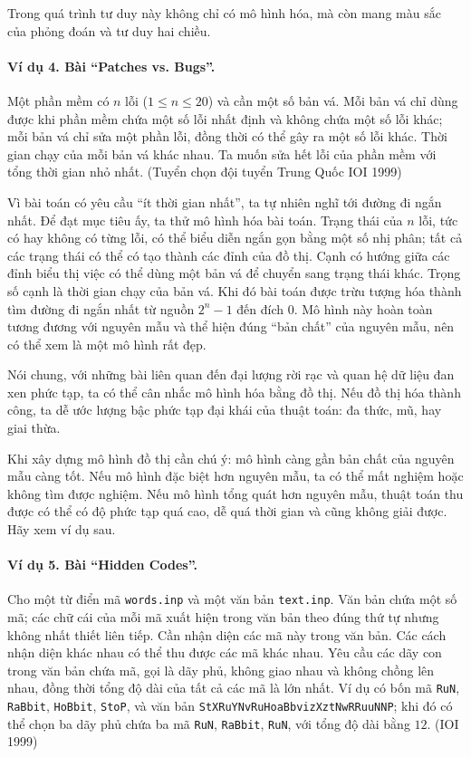 \documentclass[11pt]{article}
\begin{document}
Trong quá trình tư duy này không chỉ có mô hình hóa, mà còn mang màu sắc của
phỏng đoán và tư duy hai chiều.

\paragraph{Ví dụ 4. Bài ``Patches vs. Bugs''.}
Một phần mềm có \(n\) lỗi (\(1\le n\le 20\)) và cần một số bản vá. Mỗi bản vá
chỉ dùng được khi phần mềm chứa một số lỗi nhất định và không chứa một số lỗi
khác; mỗi bản vá chỉ sửa một phần lỗi, đồng thời có thể gây ra một số lỗi
khác. Thời gian chạy của mỗi bản vá khác nhau. Ta muốn sửa hết lỗi của phần
mềm với tổng thời gian nhỏ nhất. (Tuyển chọn đội tuyển Trung Quốc IOI 1999)

Vì bài toán có yêu cầu ``ít thời gian nhất'', ta tự nhiên nghĩ tới đường đi
ngắn nhất. Để đạt mục tiêu ấy, ta thử mô hình hóa bài toán. Trạng thái của
\(n\) lỗi, tức có hay không có từng lỗi, có thể biểu diễn ngắn gọn bằng một số
nhị phân; tất cả các trạng thái có thể có tạo thành các đỉnh của đồ thị. Cạnh
có hướng giữa các đỉnh biểu thị việc có thể dùng một bản vá để chuyển sang
trạng thái khác. Trọng số cạnh là thời gian chạy của bản vá. Khi đó bài toán
được trừu tượng hóa thành tìm đường đi ngắn nhất từ nguồn \(2^n-1\) đến đích
\(0\). Mô hình này hoàn toàn tương đương với nguyên mẫu và thể hiện đúng
``bản chất'' của nguyên mẫu, nên có thể xem là một mô hình rất đẹp.

Nói chung, với những bài liên quan đến đại lượng rời rạc và quan hệ dữ liệu
đan xen phức tạp, ta có thể cân nhắc mô hình hóa bằng đồ thị. Nếu đồ thị hóa
thành công, ta dễ ước lượng bậc phức tạp đại khái của thuật toán: đa thức,
mũ, hay giai thừa.

Khi xây dựng mô hình đồ thị cần chú ý: mô hình càng gần bản chất của nguyên
mẫu càng tốt. Nếu mô hình đặc biệt hơn nguyên mẫu, ta có thể mất nghiệm hoặc
không tìm được nghiệm. Nếu mô hình tổng quát hơn nguyên mẫu, thuật toán thu
được có thể có độ phức tạp quá cao, dễ quá thời gian và cũng không giải được.
Hãy xem ví dụ sau.

\paragraph{Ví dụ 5. Bài ``Hidden Codes''.}
Cho một từ điển mã \texttt{words.inp} và một văn bản \texttt{text.inp}. Văn bản
chứa một số mã; các chữ cái của mỗi mã xuất hiện trong văn bản theo đúng thứ
tự nhưng không nhất thiết liên tiếp. Cần nhận diện các mã này trong văn bản.
Các cách nhận diện khác nhau có thể thu được các mã khác nhau. Yêu cầu các
dãy con trong văn bản chứa mã, gọi là dãy phủ, không giao nhau và không chồng
lên nhau, đồng thời tổng độ dài của tất cả các mã là lớn nhất. Ví dụ có bốn
mã \texttt{RuN}, \texttt{RaBbit}, \texttt{HoBbit}, \texttt{StoP}, và văn bản
\texttt{StXRuYNvRuHoaBbvizXztNwRRuuNNP}; khi đó có thể chọn ba dãy phủ chứa
ba mã \texttt{RuN}, \texttt{RaBbit}, \texttt{RuN}, với tổng độ dài bằng \(12\).
(IOI 1999)
\end{document}

